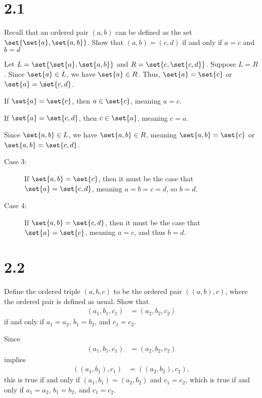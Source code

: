 \documentclass[10pt]{mypackage}
\begin{document}
\RaggedRight
\section{2.1}%
\begin{problem}
  \normalsize
  Recall that an ordered pair $(a,b)$ can be defined as the set $\set{\set{a},\set{a,b}}$. Show that $(a,b) = (c,d)$ if and only if $a=c$ and $b=d$
\end{problem}
\begin{solution}
  Let $L = \set{\set{a},\set{a,b}}$ and $R = \set{c,\set{c,d}}$. Suppose $L = R$. Since $\set{a}\in L$, we have $\set{a}\in R$. Thus, $\set{a} = \set{c}$ or $\set{a} = \set{c,d}$.
  \begin{description}[leftmargin=0pt]
    \item[Case 1:] If $\set{a} = \set{c}$, then $a\in \set{c}$, meaning $a = c$.
    \item[Case 2:] If $\set{a} = \set{c,d}$, then $c\in \set{a}$, meaning $c = a$.
  \end{description}
  Since $\set{a,b}\in L$, we have $\set{a,b} \in R$, meaning $\set{a,b} = \set{c}$ or $\set{a,b} = \set{c,d}$.
  \begin{description}
    \item[Case 3:] If $\set{a,b} = \set{c}$, then it must be the case that $\set{a} = \set{c,d}$, meaning $a = b = c = d$, so $b = d$.
    \item[Case 4:] If $\set{a,b} = \set{c,d}$, then it must be the case that $\set{a} = \set{c}$, meaning $a = c$, and thus $b = d$.
  \end{description}
\end{solution}
\section{2.2}%
\begin{problem}
  Define the ordered triple $(a,b,c)$ to be the ordered pair $\left((a,b),c\right)$, where the ordered pair is defined as usual. Show that
  \begin{align*}
    \left(a_1,b_1,c_1\right) &= \left(a_2,b_2,c_2\right)
  \end{align*}
  if and only if $a_1 = a_2$, $b_1 = b_2$, and $c_1 = c_2$.
\end{problem}
\begin{solution}
  Since
  \begin{align*}
    \left(a_1,b_1,c_1\right) &= \left(a_2,b_2,c_2\right)
  \end{align*}
  implies
  \begin{align*}
    \left(\left(a_1,b_1\right),c_1\right) &= \left(\left(a_2,b_2\right),c_2\right),
  \end{align*}
  this is true if and only if $\left(a_1,b_1\right) = \left(a_2,b_2\right)$ and $c_1 = c_2$, which is true if and only if $a_1 = a_2$, $b_1 = b_2$, and $c_1 = c_2$.
\end{solution}
\end{document}
